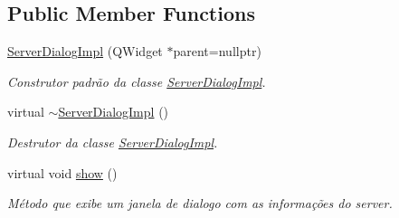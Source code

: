 \subsection*{Public Member Functions}
\begin{DoxyCompactItemize}
\item 
\hyperlink{classServerDialogImpl_a5a5cf39e32c0559a8fcdeb372fb055b3}{Server\+Dialog\+Impl} (Q\+Widget $\ast$parent=nullptr)
\begin{DoxyCompactList}\small\item\em Construtor padrão da classe \hyperlink{classServerDialogImpl}{Server\+Dialog\+Impl}. \end{DoxyCompactList}\item 
virtual \hyperlink{classServerDialogImpl_a0e73fbf7d75d033ec4ec12dc93931952}{$\sim$\+Server\+Dialog\+Impl} ()\hypertarget{classServerDialogImpl_a0e73fbf7d75d033ec4ec12dc93931952}{}\label{classServerDialogImpl_a0e73fbf7d75d033ec4ec12dc93931952}

\begin{DoxyCompactList}\small\item\em Destrutor da classe \hyperlink{classServerDialogImpl}{Server\+Dialog\+Impl}. \end{DoxyCompactList}\item 
virtual void \hyperlink{classServerDialogImpl_a6d84adfcfb187c124cc9a0a73a17c44d}{show} ()
\begin{DoxyCompactList}\small\item\em Método que exibe um janela de dialogo com as informações do server. \end{DoxyCompactList}\end{DoxyCompactItemize}

